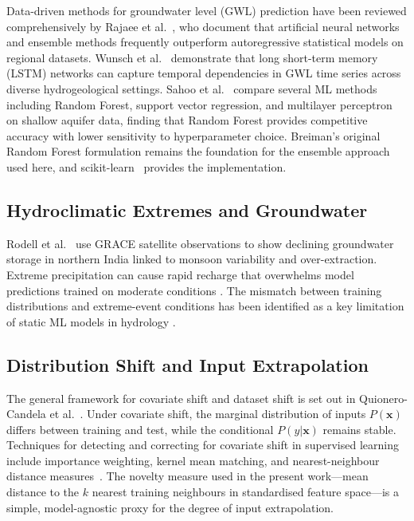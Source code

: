 \documentclass[conference]{IEEEtran}
\begin{document}
Data-driven methods for groundwater level (GWL) prediction have been
reviewed comprehensively by Rajaee et al.~\cite{rajaee2019review}, who
document that artificial neural networks and ensemble methods frequently
outperform autoregressive statistical models on regional datasets.
Wunsch et al.~\cite{wunsch2021groundwater} demonstrate that long
short-term memory (LSTM) networks can capture temporal dependencies in
GWL time series across diverse hydrogeological settings.
Sahoo et al.~\cite{sahoo2017machine} compare several ML methods
including Random Forest, support vector regression, and multilayer
perceptron on shallow aquifer data, finding that Random Forest provides
competitive accuracy with lower sensitivity to hyperparameter choice.
Breiman's original Random Forest formulation \cite{breiman2001random}
remains the foundation for the ensemble approach used here, and
scikit-learn~\cite{pedregosa2011scikit} provides the implementation.

\subsection{Hydroclimatic Extremes and Groundwater}

Rodell et al.~\cite{rodell2009satellite} use GRACE satellite observations
to show declining groundwater storage in northern India linked to
monsoon variability and over-extraction.
Extreme precipitation can cause rapid recharge that overwhelms model
predictions trained on moderate conditions \cite{wunsch2021groundwater}.
The mismatch between training distributions and extreme-event conditions
has been identified as a key limitation of static ML models in
hydrology \cite{rajaee2019review}.

\subsection{Distribution Shift and Input Extrapolation}

The general framework for covariate shift and dataset shift is set out in
Quionero-Candela et al.~\cite{quionero2009dataset}.
Under covariate shift, the marginal distribution of inputs $P(\mathbf{x})$
differs between training and test, while the conditional $P(y|\mathbf{x})$
remains stable.
Techniques for detecting and correcting for covariate shift in supervised
learning include importance weighting, kernel mean matching, and
nearest-neighbour distance measures~\cite{quionero2009dataset}.
The novelty measure used in the present work---mean distance to the $k$
nearest training neighbours in standardised feature space---is a
simple, model-agnostic proxy for the degree of input extrapolation.
\end{document}
